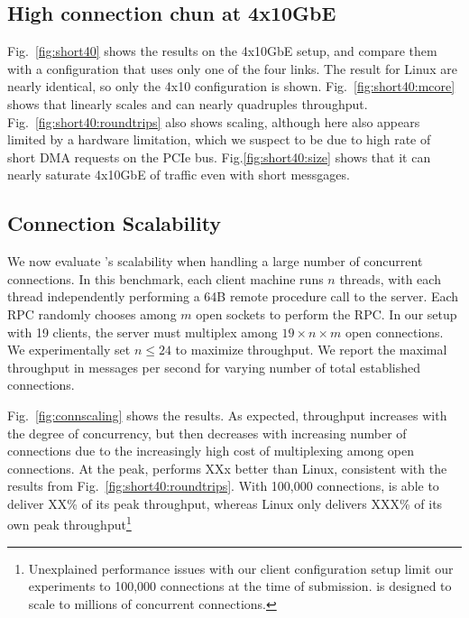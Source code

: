 \subsection{High connection chun at 4x10GbE}
\label{sec:eval:short40}

Fig.~\ref{fig:short40} shows the results on the 4x10GbE setup, and
compare them with a configuration that uses only one of the four
links.  The result for Linux are nearly identical, so only the 4x10
configuration is shown.  Fig.~\ref{fig:short40:mcore} shows that \ix
linearly scales and can nearly quadruples throughput.
Fig.~\ref{fig:short40:roundtrips} also shows scaling, although here
also appears limited by a hardware limitation, which we suspect to be
due to high rate of short DMA requests on the PCIe bus.
Fig.\ref{fig:short40:size} shows that it can nearly saturate 4x10GbE
of traffic even with short messgages.

\subsection{Connection Scalability}


\label{sec:eval:scale}

We now evaluate \ix's scalability when handling a large number of
concurrent connections. In this benchmark, each client machine runs
$n$ threads, with each thread independently performing a 64B remote
procedure call to the server.  Each RPC randomly chooses among $m$
open sockets to perform the RPC.  In our setup with 19 clients, the
server must multiplex among $19 \times n \times m$ open connections.
We experimentally set $n \leq 24$ to maximize throughput.  We report
the maximal throughput in messages per second for varying number of
total established connections.

Fig.~\ref{fig:connscaling} shows the results.  As expected, throughput
increases with the degree of concurrency, but then decreases with
increasing number of connections due to the increasingly high cost of
multiplexing among open connections.  At the peak, \ix performs XXx
better than Linux, consistent with the results from
Fig.~\ref{fig:short40:roundtrips}.  With 100,000 connections, \ix is
able to deliver XX\% of its peak throughput, whereas Linux only
delivers XXX\% of its own peak throughput\footnote{Unexplained
  performance issues with our client configuration setup limit our
  experiments to 100,000 connections at the time of submission. \ix is
  designed to scale to millions of concurrent connections.}



